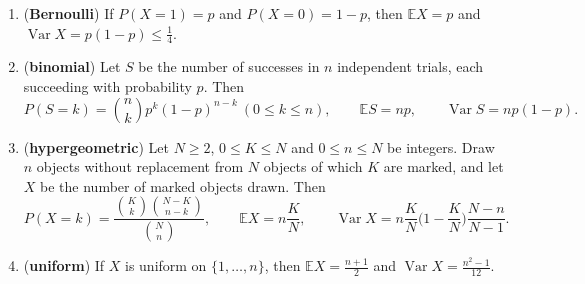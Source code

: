 \begin{proposition}\label{prop:laws}
\begin{enumerate}[label=(\alph*)]
\item (\textbf{Bernoulli}) If $P(X=1)=p$ and $P(X=0)=1-p$, then $\mathbb E X=p$ and $\operatorname{Var}X=p(1-p)\le\frac14$.
\item (\textbf{binomial}) Let $S$ be the number of successes in $n$ independent trials, each succeeding with probability $p$. Then
\[
P(S=k)=\binom nkp^k(1-p)^{n-k}\ (0\le k\le n),\qquad\mathbb E S=np,\qquad\operatorname{Var}S=np(1-p).
\]
\item (\textbf{hypergeometric}) Let $N\ge2$, $0\le K\le N$ and $0\le n\le N$ be integers. Draw $n$ objects without replacement from $N$ objects of which $K$ are marked, and let $X$ be the number of marked objects drawn. Then
\[
P(X=k)=\frac{\binom Kk\binom{N-K}{n-k}}{\binom Nn},\qquad\mathbb E X=n\frac KN,\qquad\operatorname{Var}X=n\frac KN\Big(1-\frac KN\Big)\frac{N-n}{N-1}.
\]
\item (\textbf{uniform}) If $X$ is uniform on $\{1,\dots,n\}$, then $\mathbb EX=\frac{n+1}2$ and $\operatorname{Var}X=\frac{n^2-1}{12}$.
\end{enumerate}
\end{proposition}
